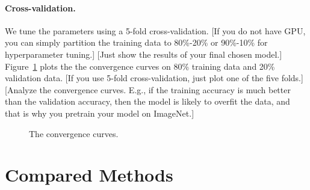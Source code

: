 \documentclass[11pt]{article}
\numberwithin{equation}{section}
\begin{document}
\paragraph{Cross-validation.}
We tune the parameters using a 5-fold cross-validation. [If you do not have GPU, you can simply partition the training data to 80\%-20\% or 90\%-10\% for hyperparameter tuning.]
[Just show the results of your final chosen model.]
Figure~\ref{fig:convergence} plots the the convergence curves on 80\% training data and 20\% validation data. [If you use 5-fold cross-validation, just plot one of the five folds.]
[Analyze the convergence curves. E.g., if the training accuracy is much better than the validation accuracy, then the model is likely to overfit the data, and that is why you pretrain your model on ImageNet.] 


\begin{figure}
	\begin{center}
	\end{center}
	\caption{The convergence curves.}
	\label{fig:convergence}
\end{figure}





\section{Compared Methods}
\end{document}
